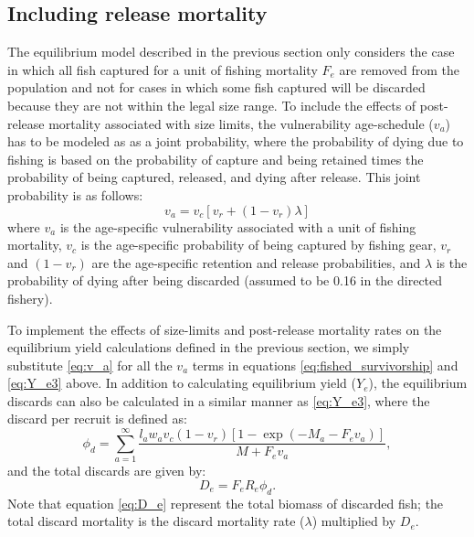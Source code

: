 \subsection*{Including release mortality} %
\label{sub:including_release_mortality}
The equilibrium model described in the previous section only considers the case in which all fish captured for a unit of fishing mortality $F_e$ are removed from the population and not for cases in which some fish captured will be discarded because they are not within the legal size range.  To include the effects of post-release mortality associated with size limits, the vulnerability age-schedule ($v_a$) has to be modeled as as a joint probability, where the probability of dying due to fishing is based on the probability of capture and being retained times the probability of being captured, released, and dying after release.  This joint probability is as follows:
\begin{equation} \label{eq:v_a}
	v_a = v_c[v_r + (1-v_r)\lambda]
\end{equation}
where $v_a$ is the age-specific vulnerability associated with a unit of fishing mortality, $v_c$ is the age-specific probability of being captured by fishing gear, $v_r$ and $(1-v_r)$ are the age-specific retention and release probabilities, and $\lambda$ is the probability of dying after being discarded (assumed to be 0.16 in the directed fishery).

To implement the effects of size-limits and post-release mortality rates on the equilibrium yield calculations defined in the previous section, we simply substitute \eqref{eq:v_a} for all the $v_a$ terms in equations \ref{eq:fished_survivorship} and \ref{eq:Y_e3} above.  In addition to calculating equilibrium yield ($Y_e$), the equilibrium discards can also be calculated in a similar manner as \eqref{eq:Y_e3}, where the discard per recruit is defined as:
\begin{equation}\label{eq:phi_d}
	\phi_d = \sum_{a=1}^\infty \frac{l_a w_a v_c(1-v_r) [1-\exp(-M_a-F_e v_a)]}{M+F_e v_a},
\end{equation}
and the total discards are given by:
\begin{equation}\label{eq:D_e}
	D_e = F_e R_e \phi_d.
\end{equation}
Note that equation \ref{eq:D_e} represent the total biomass of discarded fish; the total discard mortality is  the discard mortality rate ($\lambda$) multiplied by $D_e$.

